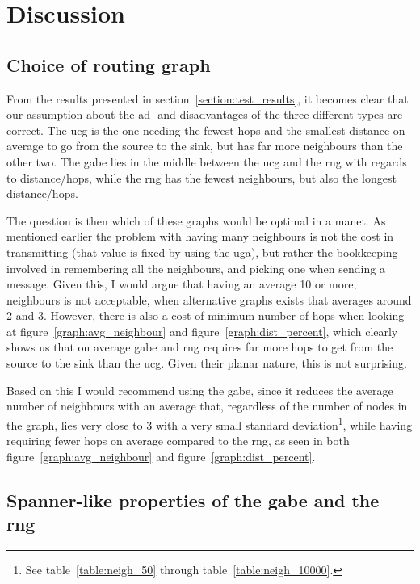 \section{Discussion}
\label{section:discussion}

\subsection{Choice of routing graph}

From the results presented in section~\ref{section:test_results}, it becomes clear that our assumption about the ad- and disadvantages of the three different types are correct. The \ac{ucg} is the one needing the fewest hops and the smallest distance on average to go from the source to the sink, but has far more neighbours than the other two. The \ac{gabe} lies in the middle between the \ac{ucg} and the \ac{rng} with regards to distance/hops, while the \ac{rng} has the fewest neighbours, but also the longest distance/hops. 

The question is then which of these graphs would be optimal in a \ac{manet}. As mentioned earlier the problem with having many neighbours is not the cost in transmitting (that value is fixed by using the \ac{uga}), but rather the bookkeeping involved in remembering all the neighbours, and picking one when sending a message. Given this, I would argue that having an average 10 or more, neighbours is not acceptable, when alternative graphs exists that averages around 2 and 3. However, there is also a cost of minimum number of hops when looking at figure~\ref{graph:avg_neighbour} and figure~\ref{graph:dist_percent}, which clearly shows us that on average \ac{gabe} and \ac{rng} requires far more hops to get from the source to the sink than the \ac{ucg}. Given their planar nature, this is not surprising. 

Based on this I would recommend using the \ac{gabe}, since it reduces the average number of neighbours with an average that, regardless of the number of nodes in the graph, lies very close to 3 with a very small standard deviation\footnote{See table~\ref{table:neigh_50} through table~\ref{table:neigh_10000}.}, while having requiring fewer hops on average compared to the \ac{rng}, as seen in both figure~\ref{graph:avg_neighbour} and figure~\ref{graph:dist_percent}.

\subsection{Spanner-like properties of the \ac{gabe} and the \ac{rng}}


